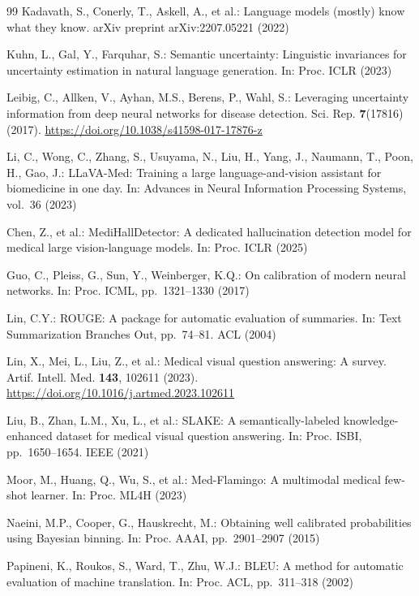 \documentclass[pdflatex,sn-mathphys-num]{sn-jnl}
\begin{document}
\begin{thebibliography}{99}
Kadavath, S., Conerly, T., Askell, A., et al.: Language models (mostly) know what they know. arXiv preprint arXiv:2207.05221 (2022)

Kuhn, L., Gal, Y., Farquhar, S.: Semantic uncertainty: Linguistic invariances for uncertainty estimation in natural language generation. In: Proc. ICLR (2023)

Leibig, C., Allken, V., Ayhan, M.S., Berens, P., Wahl, S.: Leveraging uncertainty information from deep neural networks for disease detection. Sci. Rep. \textbf{7}(17816) (2017). \url{https://doi.org/10.1038/s41598-017-17876-z}

Li, C., Wong, C., Zhang, S., Usuyama, N., Liu, H., Yang, J., Naumann, T., Poon, H., Gao, J.: LLaVA-Med: Training a large language-and-vision assistant for biomedicine in one day. In: Advances in Neural Information Processing Systems, vol.~36 (2023)

Chen, Z., et al.: MediHallDetector: A dedicated hallucination detection model for medical large vision-language models. In: Proc. ICLR (2025)

Guo, C., Pleiss, G., Sun, Y., Weinberger, K.Q.: On calibration of modern neural networks. In: Proc. ICML, pp.~1321--1330 (2017)

Lin, C.Y.: ROUGE: A package for automatic evaluation of summaries. In: Text Summarization Branches Out, pp.~74--81. ACL (2004)

Lin, X., Mei, L., Liu, Z., et al.: Medical visual question answering: A survey. Artif. Intell. Med. \textbf{143}, 102611 (2023). \url{https://doi.org/10.1016/j.artmed.2023.102611}

Liu, B., Zhan, L.M., Xu, L., et al.: SLAKE: A semantically-labeled knowledge-enhanced dataset for medical visual question answering. In: Proc. ISBI, pp.~1650--1654. IEEE (2021)

Moor, M., Huang, Q., Wu, S., et al.: Med-Flamingo: A multimodal medical few-shot learner. In: Proc. ML4H (2023)

Naeini, M.P., Cooper, G., Hauskrecht, M.: Obtaining well calibrated probabilities using Bayesian binning. In: Proc. AAAI, pp.~2901--2907 (2015)

Papineni, K., Roukos, S., Ward, T., Zhu, W.J.: BLEU: A method for automatic evaluation of machine translation. In: Proc. ACL, pp.~311--318 (2002)


\end{thebibliography}
\end{document}
